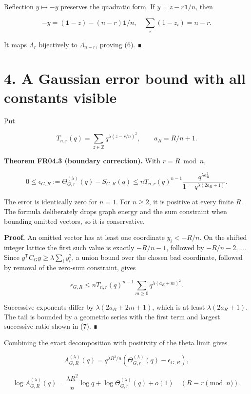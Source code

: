 \documentclass[
  11pt,
  a4paper,
]{report}
\begin{document}
Reflection \(y\mapsto-y\) preserves the quadratic form. If
\(y=z-r\mathbf1/n\), then

\[
 -y=(\mathbf1-z)-(n-r)\mathbf1/n,
 \quad \sum_i(1-z_i)=n-r.
\]

It maps \(\Lambda_r\) bijectively to \(\Lambda_{n-r}\), proving (6). ∎

\hypertarget{a-gaussian-error-bound-with-all-constants-visible}{%
\section{4. A Gaussian error bound with all constants
visible}\label{a-gaussian-error-bound-with-all-constants-visible}}

Put

\[
 T_{n,r}(q)=\sum_{z\in\mathbb Z}q^{\lambda(z-r/n)^2},
 \qquad a_R=R/n+1.
\]

\textbf{Theorem FR04.3 (boundary correction).} With \(r=R\bmod n\),

\[
 0\le\epsilon_{G,R}
 :=\Theta_{G,r}^{(\lambda)}(q)-S_{G,R}(q)
 \le nT_{n,r}(q)^{n-1}
 \frac{q^{\lambda a_R^2}}
 {1-q^{\lambda(2a_R+1)}}.
 \tag{7}
\]

The error is identically zero for \(n=1\). For \(n\ge2\), it is positive
at every finite \(R\). The formula deliberately drops graph energy and
the sum constraint when bounding omitted vectors, so it is conservative.

\textbf{Proof.} An omitted vector has at least one coordinate
\(y_i<-R/n\). On the shifted integer lattice the first such value is
exactly \(-R/n-1\), followed by \(-R/n-2,\ldots\). Since
\(y^{\mathsf T}C_Gy\ge\lambda\sum_i y_i^2\), a union bound over the
chosen bad coordinate, followed by removal of the zero-sum constraint,
gives

\[
 \epsilon_{G,R}
 \le nT_{n,r}(q)^{n-1}
 \sum_{m\ge0}q^{\lambda(a_R+m)^2}.
\]

Successive exponents differ by \(\lambda(2a_R+2m+1)\), which is at least
\(\lambda(2a_R+1)\). The tail is bounded by a geometric series with the
first term and largest successive ratio shown in (7). ∎

Combining the exact decomposition with positivity of the theta limit
gives

\[
 A_{G,R}^{(\lambda)}(q)
 =q^{\lambda R^2/n}
 \left(\Theta_{G,r}^{(\lambda)}(q)-\epsilon_{G,R}\right),
 \tag{8}
\]

\[
 \log A_{G,R}^{(\lambda)}(q)
 =\frac{\lambda R^2}{n}\log q
 +\log\Theta_{G,r}^{(\lambda)}(q)+o(1)
 \quad(R\equiv r\pmod n).
 \tag{9}
\]
\end{document}
